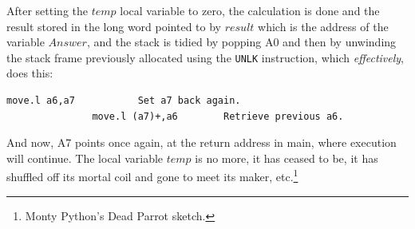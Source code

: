 After setting the $temp$ local variable to zero, the calculation is done and the result stored in the long word pointed to by $result$ which is the address of the variable $Answer$, and the stack is tidied by popping A0 and then by unwinding the stack frame previously allocated using the \texttt{UNLK} instruction, which \emph{effectively}, does this:

\begin{lstlisting}[firstnumber=1,caption={UNLK Effective Code}]
               move.l a6,a7           Set a7 back again.
               move.l (a7)+,a6        Retrieve previous a6.
\end{lstlisting}

And now, A7 points once again, at the return address in main, where execution will continue. The local variable $temp$ is no more, it has ceased to be, it has shuffled off its mortal coil and gone to meet its maker, etc.\footnote{Monty Python's Dead Parrot sketch.}
